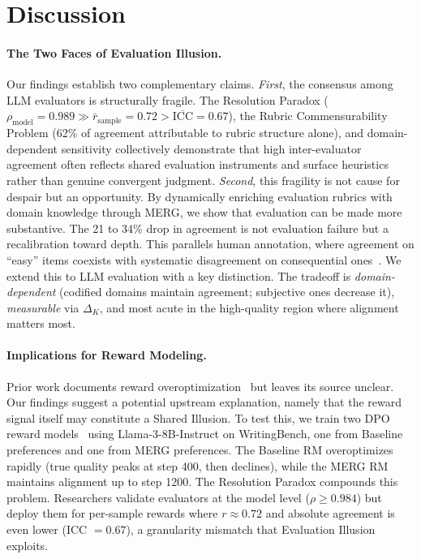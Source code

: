 \documentclass{article}
\begin{document}
\section{Discussion}
\label{sec:discussion}

\paragraph{The Two Faces of Evaluation Illusion.}
Our findings establish two complementary claims. \textit{First}, the consensus among LLM evaluators is structurally fragile. The Resolution Paradox ($\rho_{\text{model}} = 0.989 \gg \bar{r}_{\text{sample}} = 0.72 > \overline{\text{ICC}} = 0.67$), the Rubric Commensurability Problem (62\% of agreement attributable to rubric structure alone), and domain-dependent sensitivity collectively demonstrate that high inter-evaluator agreement often reflects shared evaluation instruments and surface heuristics rather than genuine convergent judgment. \textit{Second}, this fragility is not cause for despair but an opportunity. By dynamically enriching evaluation rubrics with domain knowledge through MERG, we show that evaluation can be made more substantive. The 21 to 34\% drop in agreement is not evaluation failure but a recalibration toward depth. This parallels human annotation, where agreement on ``easy'' items coexists with systematic disagreement on consequential ones~\citep{plank2022problem}. We extend this to LLM evaluation with a key distinction. The tradeoff is \textit{domain-dependent} (codified domains maintain agreement; subjective ones decrease it), \textit{measurable} via $\Delta_K$, and most acute in the high-quality region where alignment matters most.

\paragraph{Implications for Reward Modeling.}
Prior work documents reward overoptimization~\citep{gao2023scaling, rafailov2024scaling} but leaves its source unclear. Our findings suggest a potential upstream explanation, namely that the reward signal itself may constitute a Shared Illusion. To test this, we train two DPO reward models~\citep{rafailov2024direct} using Llama-3-8B-Instruct on WritingBench, one from Baseline preferences and one from MERG preferences. The Baseline RM overoptimizes rapidly (true quality peaks at step 400, then declines), while the MERG RM maintains alignment up to step 1200. The Resolution Paradox compounds this problem. Researchers validate evaluators at the model level ($\rho \geq 0.984$) but deploy them for per-sample rewards where $r \approx 0.72$ and absolute agreement is even lower (ICC $= 0.67$), a granularity mismatch that Evaluation Illusion exploits.
\end{document}
